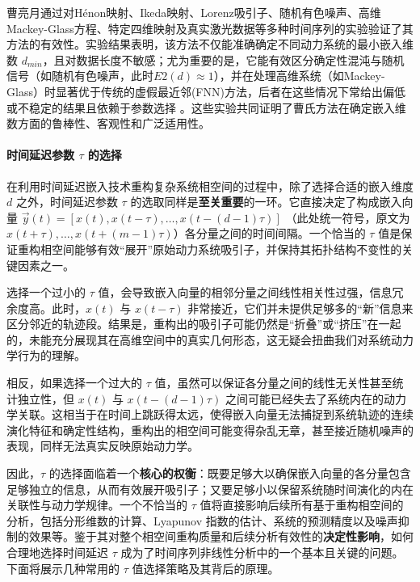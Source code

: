 曹亮月通过对Hénon映射、Ikeda映射、Lorenz吸引子、随机有色噪声、高维Mackey-Glass方程、特定四维映射及真实激光数据等多种时间序列的实验验证了其方法的有效性。实验结果表明，该方法不仅能准确确定不同动力系统的最小嵌入维数 $d_{min}$，且对数据长度不敏感；尤为重要的是，它能有效区分确定性混沌与随机信号（如随机有色噪声，此时$E2(d) \approx 1$），并在处理高维系统（如Mackey-Glass）时显著优于传统的虚假最近邻(FNN)方法，后者在这些情况下常给出偏低或不稳定的结果且依赖于参数选择 。这些实验共同证明了曹氏方法在确定嵌入维数方面的鲁棒性、客观性和广泛适用性。

\paragraph{时间延迟参数 $\tau$ 的选择} %
在利用时间延迟嵌入技术重构复杂系统相空间的过程中，除了选择合适的嵌入维度 $d$ 之外，时间延迟参数 $\tau$ 的选取同样是\textbf{至关重要}的一环。它直接决定了构成嵌入向量 $\vec{y}(t) = [x(t), x(t-\tau), \dots, x(t-(d-1)\tau)]$ （此处统一符号，原文为 $x(t+\tau), \dots, x(t+(m-1)\tau)$）各分量之间的时间间隔。一个恰当的 $\tau$ 值是保证重构相空间能够有效“展开”原始动力系统吸引子，并保持其拓扑结构不变性的关键因素之一。

选择一个过小的 $\tau$ 值，会导致嵌入向量的相邻分量之间线性相关性过强，信息冗余度高。此时，$x(t)$ 与 $x(t-\tau)$ 非常接近，它们并未提供足够多的“新”信息来区分邻近的轨迹段。结果是，重构出的吸引子可能仍然是“折叠”或“挤压”在一起的，未能充分展现其在高维空间中的真实几何形态，这无疑会扭曲我们对系统动力学行为的理解。

相反，如果选择一个过大的 $\tau$ 值，虽然可以保证各分量之间的线性无关性甚至统计独立性，但 $x(t)$ 与 $x(t-(d-1)\tau)$ 之间可能已经失去了系统内在的动力学关联。这相当于在时间上跳跃得太远，使得嵌入向量无法捕捉到系统轨迹的连续演化特征和确定性结构，重构出的相空间可能变得杂乱无章，甚至接近随机噪声的表现，同样无法真实反映原始动力学。

因此，$\tau$ 的选择面临着一个\textbf{核心的权衡}：既要足够大以确保嵌入向量的各分量包含足够独立的信息，从而有效展开吸引子；又要足够小以保留系统随时间演化的内在关联性与动力学规律。一个不恰当的 $\tau$ 值将直接影响后续所有基于重构相空间的分析，包括分形维数的计算、Lyapunov 指数的估计、系统的预测精度以及噪声抑制的效果等。鉴于其对整个相空间重构质量和后续分析有效性的\textbf{决定性影响}，如何合理地选择时间延迟 $\tau$ 成为了时间序列非线性分析中的一个基本且关键的问题。下面将展示几种常用的 $\tau$ 值选择策略及其背后的原理。

